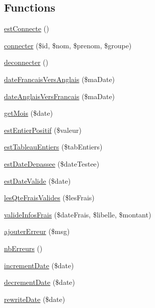 \subsection*{Functions}
\begin{DoxyCompactItemize}
\item 
\hyperlink{include_2fct_8inc_8php_a80ca5386d53e29b2b310cb83191a9b31}{est\+Connecte} ()
\item 
\hyperlink{include_2fct_8inc_8php_af0c13b76bae545816b3dde95b2706a69}{connecter} (\$id, \$nom, \$prenom, \$groupe)
\item 
\hyperlink{include_2fct_8inc_8php_a4d9cc75d1fa3fa8dc3739f4489183489}{deconnecter} ()
\item 
\hyperlink{include_2fct_8inc_8php_ab9cb222b5275222fe9adc11dbbd997a3}{date\+Francais\+Vers\+Anglais} (\$ma\+Date)
\item 
\hyperlink{include_2fct_8inc_8php_a6e0d8dd85362ba68b76db41db62e2499}{date\+Anglais\+Vers\+Francais} (\$ma\+Date)
\item 
\hyperlink{include_2fct_8inc_8php_ac6b26dbc90d7a5ec71b0585ee0786a41}{get\+Mois} (\$date)
\item 
\hyperlink{include_2fct_8inc_8php_a5891ac42bd25b5bb5a9427174f8eb15f}{est\+Entier\+Positif} (\$valeur)
\item 
\hyperlink{include_2fct_8inc_8php_a464609600321021614adc67242caff02}{est\+Tableau\+Entiers} (\$tab\+Entiers)
\item 
\hyperlink{include_2fct_8inc_8php_aa58c871e5f6cd7d51b1e8b88843f7fb1}{est\+Date\+Depassee} (\$date\+Testee)
\item 
\hyperlink{include_2fct_8inc_8php_a7fa9e2b0f911f71f0dc3857201676f6e}{est\+Date\+Valide} (\$date)
\item 
\hyperlink{include_2fct_8inc_8php_a5eaa55cf65e9070bec3a3966f5294f2a}{les\+Qte\+Frais\+Valides} (\$les\+Frais)
\item 
\hyperlink{include_2fct_8inc_8php_a38c2c9e2e53aebdd24c6cce15666893f}{valide\+Infos\+Frais} (\$date\+Frais, \$libelle, \$montant)
\item 
\hyperlink{include_2fct_8inc_8php_a9ebfa4d6e8d836827ddb02455281e5c1}{ajouter\+Erreur} (\$msg)
\item 
\hyperlink{include_2fct_8inc_8php_abc3600d37e9484937ea976542eabec4b}{nb\+Erreurs} ()
\item 
\hyperlink{include_2fct_8inc_8php_a500951c5359c6741f0dc25e1334db846}{increment\+Date} (\$date)
\item 
\hyperlink{include_2fct_8inc_8php_aacac1f06f35d6fa7027a7c7366db5f4a}{decrement\+Date} (\$date)
\item 
\hyperlink{include_2fct_8inc_8php_a34a7a40a326c04712f5c8aea4d6afd86}{rewrite\+Date} (\$date)
\end{DoxyCompactItemize}


